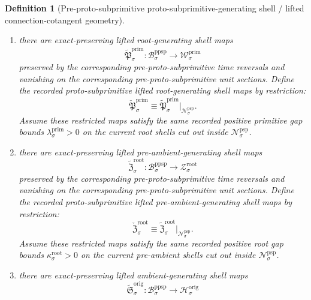 \documentclass[11pt]{article}
\newcommand{\OriginTarget}[1]{\mathcal H_{#1}^{\mathrm{orig}}}
\newcommand{\RootTarget}[1]{\mathcal Z_{#1}^{\mathrm{root}}}
\newcommand{\RootGap}[1]{\kappa_{#1}^{\mathrm{root}}}
\newcommand{\PrimTarget}[1]{\mathcal W_{#1}^{\mathrm{prim}}}
\newcommand{\PrimGap}[1]{\lambda_{#1}^{\mathrm{prim}}}
\newcommand{\SubprimGap}[1]{\mu_{#1}^{\mathrm{subprim}}}
\newcommand{\ProtoSubprimSpace}[1]{\mathcal N_{#1}^{\mathrm{psp}}}
\newcommand{\ProtoSubprimLiftedPrimitive}[1]{\check{\mathfrak G}_{#1}^{\mathrm{subprim}}}
\newcommand{\ProtoSubprimLiftedRoot}[1]{\check{\mathfrak P}_{#1}^{\mathrm{prim}}}
\newcommand{\ProtoSubprimLiftedPreAmbient}[1]{\check{\mathfrak Z}_{#1}^{\mathrm{root}}}
\newcommand{\PreProtoSubprimSpace}[1]{\mathcal B_{#1}^{\mathrm{ppsp}}}
\newcommand{\PreProtoSubprimLiftedPrimitive}[1]{\widetilde{\mathfrak G}_{#1}^{\mathrm{subprim}}}
\newcommand{\PreProtoSubprimLiftedRoot}[1]{\widetilde{\mathfrak P}_{#1}^{\mathrm{prim}}}
\newcommand{\PreProtoSubprimLiftedPreAmbient}[1]{\widetilde{\mathfrak Z}_{#1}^{\mathrm{root}}}
\newcommand{\PreProtoSubprimLiftedAmbient}[1]{\widetilde{\mathfrak S}_{#1}^{\mathrm{orig}}}
\newtheorem{definition}{Definition}
\begin{document}
\begin{definition}[Pre-proto-subprimitive proto-subprimitive-generating shell / lifted connection-cotangent geometry]
\begin{enumerate}
    \begin{equation}
    \ProtoSubprimLiftedPrimitive{\sigma}\equiv \PreProtoSubprimLiftedPrimitive{\sigma}|_{\ProtoSubprimSpace{\sigma}}.
    \label{eq:protosubprimitive_primitive_from_preprotosubprimitive}
    \end{equation}
    Assume these restricted maps satisfy the same recorded positive subprimitive gap bounds \(\SubprimGap{\sigma}>0\) on the current primitive shells cut out inside \(\ProtoSubprimSpace{\sigma}\).
    \item there are exact-preserving lifted root-generating shell maps
    \[
    \PreProtoSubprimLiftedRoot{\sigma}:\PreProtoSubprimSpace{\sigma}\to\PrimTarget{\sigma}
    \]
    preserved by the corresponding pre-proto-subprimitive time reversals and vanishing on the corresponding pre-proto-subprimitive unit sections. Define the recorded proto-subprimitive lifted root-generating shell maps by restriction:
    \begin{equation}
    \ProtoSubprimLiftedRoot{\sigma}\equiv \PreProtoSubprimLiftedRoot{\sigma}|_{\ProtoSubprimSpace{\sigma}}.
    \label{eq:protosubprimitive_root_from_preprotosubprimitive}
    \end{equation}
    Assume these restricted maps satisfy the same recorded positive primitive gap bounds \(\PrimGap{\sigma}>0\) on the current root shells cut out inside \(\ProtoSubprimSpace{\sigma}\).
    \item there are exact-preserving lifted pre-ambient-generating shell maps
    \[
    \PreProtoSubprimLiftedPreAmbient{\sigma}:\PreProtoSubprimSpace{\sigma}\to\RootTarget{\sigma}
    \]
    preserved by the corresponding pre-proto-subprimitive time reversals and vanishing on the corresponding pre-proto-subprimitive unit sections. Define the recorded proto-subprimitive lifted pre-ambient-generating shell maps by restriction:
    \begin{equation}
    \ProtoSubprimLiftedPreAmbient{\sigma}\equiv \PreProtoSubprimLiftedPreAmbient{\sigma}|_{\ProtoSubprimSpace{\sigma}}.
    \label{eq:protosubprimitive_preambient_from_preprotosubprimitive}
    \end{equation}
    Assume these restricted maps satisfy the same recorded positive root gap bounds \(\RootGap{\sigma}>0\) on the current pre-ambient shells cut out inside \(\ProtoSubprimSpace{\sigma}\).
    \item there are exact-preserving lifted ambient-generating shell maps
    \[
    \PreProtoSubprimLiftedAmbient{\sigma}:\PreProtoSubprimSpace{\sigma}\to\OriginTarget{\sigma}
\]
\end{enumerate}
\end{definition}
\end{document}
